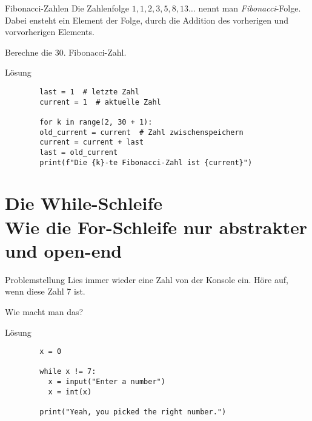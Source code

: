 \begin{fragile}
	
	
	\begin{block}{Fibonacci-Zahlen}
		\vspace{2pt}
		Die Zahlenfolge $1,1,2,3,5,8,13\ldots$ nennt man \emph{Fibonacci}-Folge. Dabei ensteht ein Element der Folge, durch die Addition des vorherigen und vorvorherigen Elements. 
		
		\vspace{1pt}
		
		Berechne die 30. Fibonacci-Zahl.  
	\end{block}
	\vspace{12pt}
	\begin{solutionblock}{Lösung}
		\begin{verbatim}
		last = 1  # letzte Zahl
		current = 1  # aktuelle Zahl
		
		for k in range(2, 30 + 1):
		old_current = current  # Zahl zwischenspeichern
		current = current + last
		last = old_current
		print(f"Die {k}-te Fibonacci-Zahl ist {current}")
		\end{verbatim}
	\end{solutionblock}
	
	
\end{fragile}


\section{Die While-Schleife \\ \footnotesize Wie die For-Schleife nur abstrakter und open-end}

\begin{frame}
\begin{block}{Problemstellung}
	\vspace{2pt}
	Lies immer wieder eine Zahl von der Konsole ein. Höre auf, wenn diese Zahl 7 ist. 
	
	Wie macht man das? 
\end{block}
\end{frame}

\begin{fragile}
	
\begin{block}{Lösung}
		\vspace{2pt}
		
	\begin{verbatim}
		x = 0
		
		while x != 7: 
		  x = input("Enter a number")
		  x = int(x)
		  
		print("Yeah, you picked the right number.")
	\end{verbatim}
	
\end{block}
\end{fragile}


